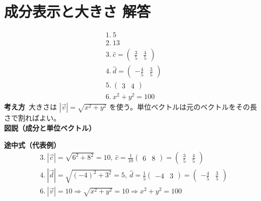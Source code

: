 \documentclass[paper=b4j,landscape,twocolumn,fleqn]{jlreq}
\begin{document}
\normalsize

\section{成分表示と大きさ 解答}
\begin{align*}
&1.\ 5\\[0.45em]
&2.\ 13\\[0.45em]
&3.\ \hat{c}=\begin{pmatrix}\frac35 & \frac45\end{pmatrix}\\[0.45em]
&4.\ \hat{d}=\begin{pmatrix}-\frac45 & \frac35\end{pmatrix}\\[0.45em]
&5.\ \begin{pmatrix}3 & 4\end{pmatrix}\\[0.45em]
&6.\ x^2+y^2=100
\end{align*}
\textbf{考え方}\
大きさは $|\vec{v}|=\sqrt{x^2+y^2}$ を使う。単位ベクトルは元のベクトルをその長さで割ればよい。\\
\textbf{図説（成分と単位ベクトル）}
\begin{center}
\end{center}
\textbf{途中式（代表例）}
\begin{align*}
&3.\ |\vec{c}|=\sqrt{6^2+8^2}=10,\ \hat{c}=\frac{1}{10}\begin{pmatrix}6 & 8\end{pmatrix}=\begin{pmatrix}\frac35 & \frac45\end{pmatrix}\\
&4.\ |\vec{d}|=\sqrt{(-4)^2+3^2}=5,\ \hat{d}=\frac{1}{5}\begin{pmatrix}-4 & 3\end{pmatrix}=\begin{pmatrix}-\frac45 & \frac35\end{pmatrix}\\
&6.\ |\vec{v}|=10\Rightarrow \sqrt{x^2+y^2}=10\Rightarrow x^2+y^2=100
\end{align*}
\end{document}
